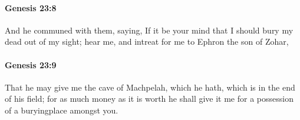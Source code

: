 		\paragraph{Genesis 23:8} %
			\label{GENESIS-23-8}

			And he communed with them, saying, If it be your mind that I should bury my dead out of my sight; hear me, and intreat for me to Ephron the son of Zohar,


		\paragraph{Genesis 23:9} %
			\label{GENESIS-23-9}

			That he may give me the cave of Machpelah, which he hath, which is in the end of his field; for as much money as it is worth he shall give it me for a possession of a buryingplace amongst you.


